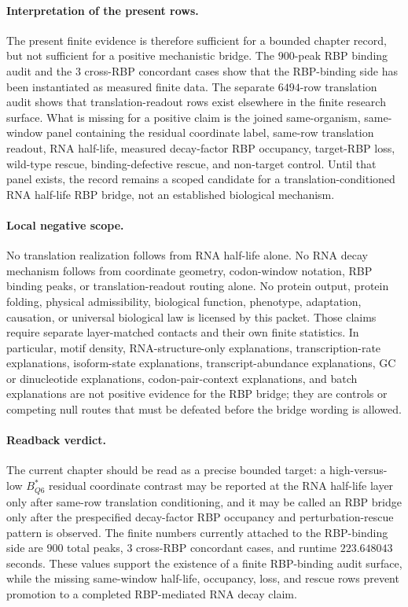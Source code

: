 \paragraph{Interpretation of the present rows.}
The present finite evidence is therefore sufficient for a bounded chapter record, but not sufficient for a positive mechanistic bridge. The $900$-peak RBP binding audit and the $3$ cross-RBP concordant cases show that the RBP-binding side has been instantiated as measured finite data. The separate $6494$-row translation audit shows that translation-readout rows exist elsewhere in the finite research surface. What is missing for a positive claim is the joined same-organism, same-window panel containing the residual coordinate label, same-row translation readout, RNA half-life, measured decay-factor RBP occupancy, target-RBP loss, wild-type rescue, binding-defective rescue, and non-target control. Until that panel exists, the record remains a scoped candidate for a translation-conditioned RNA half-life RBP bridge, not an established biological mechanism.

\paragraph{Local negative scope.}
No translation realization follows from RNA half-life alone. No RNA decay mechanism follows from coordinate geometry, codon-window notation, RBP binding peaks, or translation-readout routing alone. No protein output, protein folding, physical admissibility, biological function, phenotype, adaptation, causation, or universal biological law is licensed by this packet. Those claims require separate layer-matched contacts and their own finite statistics. In particular, motif density, RNA-structure-only explanations, transcription-rate explanations, isoform-state explanations, transcript-abundance explanations, GC or dinucleotide explanations, codon-pair-context explanations, and batch explanations are not positive evidence for the RBP bridge; they are controls or competing null routes that must be defeated before the bridge wording is allowed.

\paragraph{Readback verdict.}
The current chapter should be read as a precise bounded target: a high-versus-low $B^{*}_{Q6}$ residual coordinate contrast may be reported at the RNA half-life layer only after same-row translation conditioning, and it may be called an RBP bridge only after the prespecified decay-factor RBP occupancy and perturbation-rescue pattern is observed. The finite numbers currently attached to the RBP-binding side are $900$ total peaks, $3$ cross-RBP concordant cases, and runtime $223.648043$ seconds. These values support the existence of a finite RBP-binding audit surface, while the missing same-window half-life, occupancy, loss, and rescue rows prevent promotion to a completed RBP-mediated RNA decay claim.